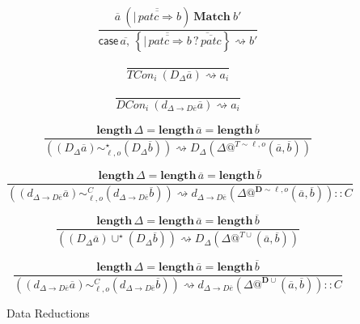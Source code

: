 \begin{figure}
\[
\frac{
  \overline{a}\ \left(\overline{|\,\overline{patc\Rightarrow}b}\right)\ \mathbf{Match}\ b'
}{
  \mathsf{case}\,\overline{a,}\,\left\{ \overline{|\,\overline{patc\Rightarrow}b}\, \overline{?\,\overline{patc}} \right\} \rightsquigarrow b'
}
\]

\[
\frac{\ }{TCon_{i}\ \left(D_{\Delta}\overline{a}\right)\rightsquigarrow a_{i}}
\]

\[
\frac{\ }{DCon_{i}\ \left(d_{\Delta\rightarrow D\overline{e}}\overline{a}\right)\rightsquigarrow a_{i}}
\]

\[
\frac{
  \mathbf{length}\,\Delta=\mathbf{length}\,\overline{a}=\mathbf{length}\,\overline{b}
}{
  \left(\left(D_{\Delta}\overline{a}\right)\sim_{\ell,o}^{\star}\left(D_{\Delta}\overline{b}\right)\right)\rightsquigarrow D_{\Delta}\left(\Delta@^{T\sim\ell,o}\left(\overline{a},\overline{b}\right)\right)}
\]

\[
\frac{
  \mathbf{length}\,\Delta=\mathbf{length}\,\overline{a}=\mathbf{length}\,\overline{b}
}{
  \left(\left(d_{\Delta\rightarrow D\overline{e}}\overline{a}\right)\sim_{\ell,o}^{C}\left(d_{\Delta\rightarrow D\overline{e}}\overline{b}\right)\right)\rightsquigarrow d_{\Delta\rightarrow D\overline{e}}\left(\Delta@^{\mathbf{D}\sim\ell,o}\left(\overline{a},\overline{b}\right)\right)::C}
\]

\[
\frac{
  \mathbf{length}\,\Delta=\mathbf{length}\,\overline{a}=\mathbf{length}\,\overline{b}
  }{\left(\left(D_{\Delta}\overline{a}\right)\cup^{\star}\left(D_{\Delta}\overline{b}\right)\right)\rightsquigarrow D_{\Delta}\left(\Delta@^{T\cup}\left(\overline{a},\overline{b}\right)\right)}
\]

\[
\frac{
  \mathbf{length}\,\Delta=\mathbf{length}\,\overline{a}=\mathbf{length}\,\overline{b}
}{
  \left(\left(d_{\Delta\rightarrow D\overline{e}}\overline{a}\right)\sim_{\ell,o}^{C}\left(d_{\Delta\rightarrow D\overline{e}}\overline{b}\right)\right)\rightsquigarrow d_{\Delta\rightarrow D\overline{e}}\left(\Delta@^{\mathbf{D}\cup}\left(\overline{a},\overline{b}\right)\right)::C}
\]
\caption{Data Reductions}
\label{fig:Data-Reductions}
\end{figure}


